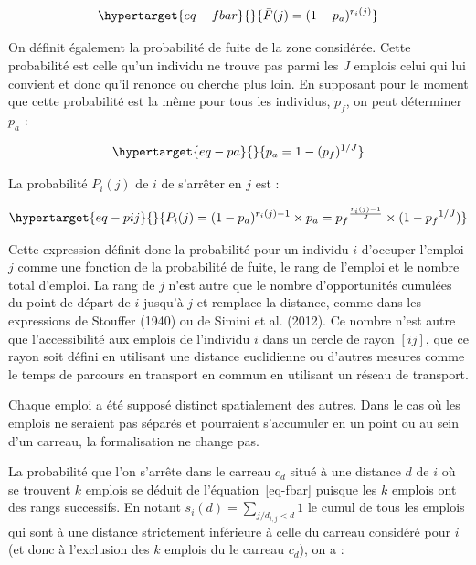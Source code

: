 \documentclass[
  10pt,
  a4paper,
  numbers=noendperiod,
  DIV=9]{scrreprt}
\begin{document}
\begin{equation}\protect\hypertarget{eq-fbar}{}{
\bar F(j)=(1-p_a)^{r_i(j)}
}\label{eq-fbar}\end{equation}

On définit également la probabilité de fuite de la zone considérée.
Cette probabilité est celle qu'un individu ne trouve pas parmi les \(J\)
emplois celui qui lui convient et donc qu'il renonce ou cherche plus
loin. En supposant pour le moment que cette probabilité est la même pour
tous les individus, \(p_f\), on peut déterminer \(p_a\) :

\begin{equation}\protect\hypertarget{eq-pa}{}{
p_a = 1-(p_f)^{1/J}
}\label{eq-pa}\end{equation}

La probabilité \(P_i(j)\) de \(i\) de s'arrêter en \(j\) est :

\begin{equation}\protect\hypertarget{eq-pij}{}{
P_i(j) = (1-p_a)^{r_i(j)-1} \times p_a = {p_f}^{\frac {r_i(j)-1} {J}} \times (1-{p_f}^{1/J})
}\label{eq-pij}\end{equation}

Cette expression définit donc la probabilité pour un individu \(i\)
d'occuper l'emploi \(j\) comme une fonction de la probabilité de fuite,
le rang de l'emploi et le nombre total d'emploi. La rang de \(j\) n'est
autre que le nombre d'opportunités cumulées du point de départ de \(i\)
jusqu'à \(j\) et remplace la distance, comme dans les expressions de
Stouffer (1940) ou de Simini et al. (2012). Ce nombre n'est autre que
l'accessibilité aux emplois de l'individu \(i\) dans un cercle de rayon
\([ij]\), que ce rayon soit défini en utilisant une distance euclidienne
ou d'autres mesures comme le temps de parcours en transport en commun en
utilisant un réseau de transport.

Chaque emploi a été supposé distinct spatialement des autres. Dans le
cas où les emplois ne seraient pas séparés et pourraient s'accumuler en
un point ou au sein d'un carreau, la formalisation ne change pas.

La probabilité que l'on s'arrête dans le carreau \(c_d\) situé à une
distance \(d\) de \(i\) où se trouvent \(k\) emplois se déduit de
l'équation~\ref{eq-fbar} puisque les \(k\) emplois ont des rangs
successifs. En notant \(s_i(d)=\sum _{j/d_{i,j}<d}1\) le cumul de tous
les emplois qui sont à une distance strictement inférieure à celle du
carreau considéré pour \(i\) (et donc à l'exclusion des \(k\) emplois du
le carreau \(c_d\)), on a :
\end{document}

